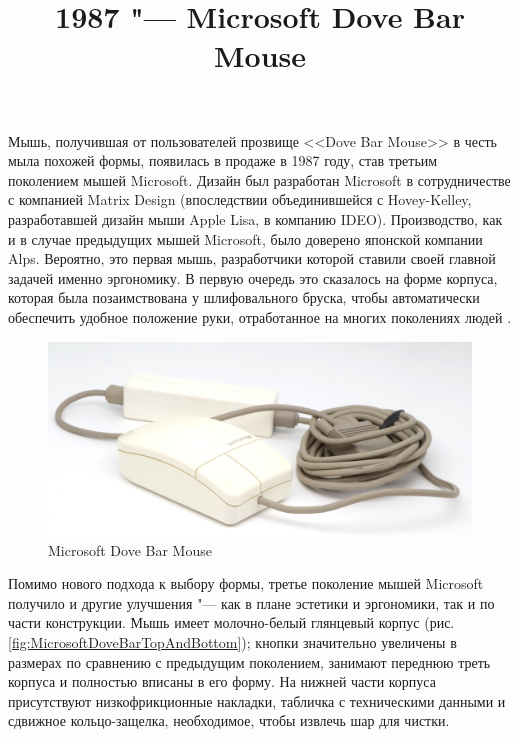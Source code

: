 \documentclass[11pt, a4paper]{article}
\begin{document}
\title{1987 "--- Microsoft Dove Bar Mouse}
\date{}
\maketitle
{}

Мышь, получившая от пользователей прозвище <<Dove Bar Mouse>> в честь мыла похожей формы, появилась в продаже в 1987 году, став третьим поколением мышей Microsoft. Дизайн был разработан Microsoft в сотрудничестве с компанией Matrix Design (впоследствии объединившейся с Hovey-Kelley, разработавшей дизайн мыши Apple Lisa, в компанию IDEO). Производство, как и в случае предыдущих мышей Microsoft, было доверено японской компании Alps. Вероятно, это первая мышь, разработчики которой ставили своей главной задачей именно эргономику. В первую очередь это сказалось на форме корпуса, которая была позаимствована у шлифовального бруска, чтобы автоматически обеспечить удобное положение руки, отработанное на многих поколениях людей \cite{doveBarDesign1, atkinson}.

\begin{figure}[h]
   \centering
    \includegraphics[scale=0.5]{1987_microsoft_dove_bar_mouse/pic_30.jpg}
    \caption{Microsoft Dove Bar Mouse}
    \label{fig:MicrosoftDoveBarPic}
\end{figure}

Помимо нового подхода к выбору формы, третье поколение мышей Microsoft получило и другие улучшения "--- как в плане эстетики и эргономики, так и по части конструкции. Мышь имеет молочно-белый глянцевый корпус (рис. \ref{fig:MicrosoftDoveBarTopAndBottom}); кнопки значительно увеличены в размерах по сравнению с предыдущим поколением, занимают переднюю треть корпуса и полностью вписаны в его форму. На нижней части корпуса присутствуют низкофрикционные накладки, табличка с техническими данными и сдвижное кольцо-защелка, необходимое, чтобы извлечь шар для чистки.
\end{document}
